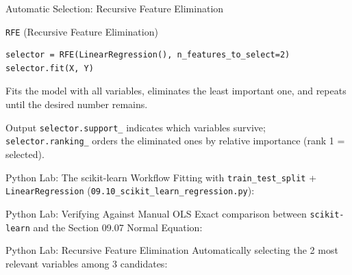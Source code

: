 \documentclass[10pt, aspectratio=169]{beamer}
\begin{document}
\begin{frame}[fragile]{Automatic Selection: Recursive Feature Elimination}
  \footnotesize
  \begin{block}{\texttt{RFE} (Recursive Feature Elimination)}
    \begin{verbatim}
selector = RFE(LinearRegression(), n_features_to_select=2)
selector.fit(X, Y)
    \end{verbatim}
    Fits the model with all variables, eliminates the least important one, and repeats until the desired number remains.
  \end{block}
  \pause

  \vspace{0.1cm}
  \begin{alertblock}{Output}
    \texttt{selector.support\_} indicates which variables survive; \texttt{selector.ranking\_} orders the eliminated ones by relative importance (rank 1 = selected).
  \end{alertblock}
\end{frame}

\begin{frame}[fragile]{Python Lab: The scikit-learn Workflow}
  \scriptsize
  Fitting with \texttt{train\_test\_split} + \texttt{LinearRegression} (\texttt{09.10\_scikit\_learn\_regression.py}):
  {
  }
\end{frame}

\begin{frame}[fragile]{Python Lab: Verifying Against Manual OLS}
  \scriptsize
  Exact comparison between \texttt{scikit-learn} and the Section 09.07 Normal Equation:
  {
  }
\end{frame}

\begin{frame}[fragile]{Python Lab: Recursive Feature Elimination}
  \scriptsize
  Automatically selecting the 2 most relevant variables among 3 candidates:
  {
  }
\end{frame}
\end{document}
